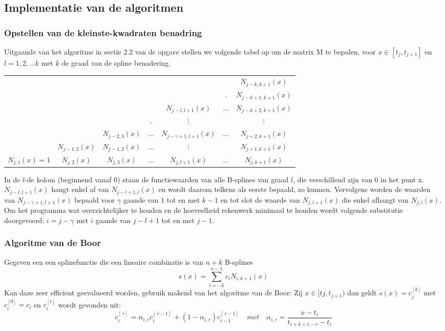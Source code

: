 \documentclass[a4paper]{article}
\begin{document}
\subsection{Implementatie van de algoritmen}
\subsubsection{Opstellen van de kleinste-kwadraten benadring}
Uitgaande van het algoritme in sectie 2.2 van de opgave stellen we volgende tabel op om de matrix M te bepalen, voor $x \in [t_j, t_{j+1}]$ en $l=1, 2, ... k$ met $k$ de graad van de spline benadering.
\begin{table}[H]
	\centering
	\begin{tabular}{| c c c c c c c  |}
		\hline
		& & & & & & $N_{j-k,k+1}(x)$ \\
		& & & & & . & $N_{j-k+1,k+1}(x)$ \\
		& & & & $N_{j-l,l+1}(x)$ & $\hdots$ & $N_{j-k+2,k+1}(x)$ \\
		& & & . & $\vdots$  & & $\vdots$\\
		& & $N_{j-2,3}(x)$ & $\hdots$ & $N_{j-\gamma+1,l+1}(x)$ & $\hdots$ & $N_{j+2,k+1}(x)$   \\
		& $N_{j-1,2}(x)$ & $N_{j-1,2}(x)$ & $\hdots$ & $\vdots$ &  &$N_{j+1,k+1}(x)$ \\
		$N_{j,1}(x) = 1$ & $N_{j,2}(x)$ & $N_{j,3}(x)$ & $\hdots$ & $N_{j,l+1}(x)$ & $\hdots$ & $N_{j,k+1}(x)$ \\ 
		\hline
	\end{tabular}
\end{table}
In de $l$-de kolom (beginnend vanaf 0) staan de functiewaarden van alle B-splines van graad $l$, die verschillend zijn van 0 in het punt x. 
$N_{j-l,l+1}(x)$ hangt enkel af van $N_{j-l+1,l}(x)$ en wordt daarom telkens als eerste bepaald, zo kunnen. Vervolgens worden de waarden van $N_{j-\gamma+1,l+1}(x)$ bepaald voor $\gamma$ gaande van $1$ tot en met $k-1$ en tot slot de waarde van $N_{j,l+1}(x)$ die enkel afhangt van $N_{j,l}(x)$. Om het programma wat overzichtelijker te houden en de hoeveelheid rekenwerk minimaal te houden wordt volgende substitutie doorgevoerd: $i=j-\gamma$ met $i$ gaande van $j-l+1$ tot en met $j-1$.
\newpage

\newpage

\subsubsection{Algoritme van de Boor}
Gegeven een een splinefunctie die een lineaire combinatie is van $n+k$ B-splines
\begin{equation}\label{eq:deboor}
	s(x) = \sum\limits_{i=-k}^{n-1} c_iN_{i, k+1}(x)
\end{equation}
Kan daze zeer efficient geevalueerd worden, gebruik makend van het algoritme van de Boor:
Zij $x\in[t{j}, t_{j+1})$ dan geldt $s(x)=c_{j}^{[k]}$ met $c_i^{[0]} = c_i$ en $c_i^{[r]}$ wordt gevonden uit:
\begin{equation}\label{eq:deboorcoef}
	c_i^{[\, r]\, } = \alpha_{i,r} c_i^{[\, r-1]\, } + (1-\alpha_{i,r})c_{i-1}^{[\, r-1]\, } \quad met \quad \alpha_{i,r} = \frac{x-t_i}{t_{i+k+1-r}-t_i}
\end{equation}
\end{document}
